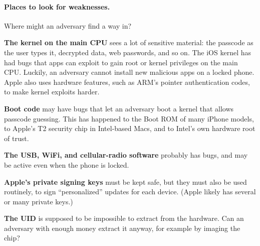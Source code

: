 \paragraph{Places to look for weaknesses.}
Where might an adversary find a way in?
\begin{compactitem}
  \item \textbf{The kernel on the main CPU} sees a lot of sensitive
        material: the passcode as the user types it, decrypted data, web
        passwords, and so on.
        The iOS kernel has had bugs that apps can exploit to gain root or
        kernel privileges on the main CPU.
        Luckily, an adversary cannot install new malicious apps on a locked
        phone.
        Apple also uses hardware features, such as ARM's pointer
        authentication codes, to make kernel exploits
        harder.\autocite{corbet:pac,azad:pac}
  \item \textbf{Boot code} may have bugs that let an adversary boot a
        kernel that allows passcode guessing.
        This has happened to the Boot ROM of many iPhone models, to Apple's
        T2 security chip in Intel-based Macs,\autocite{goodin:t2} and to
        Intel's own hardware root of trust.\autocite{ermolov:intel}
  \item \textbf{The USB, WiFi, and cellular-radio software} probably has
        bugs, and may be active even when the phone is locked.
  \item \textbf{Apple's private signing keys} must be kept safe, but
        they must also be used routinely, to sign ``personalized''
        updates for each device.
        (Apple likely has several or many private keys.)
  \item \textbf{The UID} is supposed to be impossible to extract from the
        hardware.
        Can an adversary with enough money extract it anyway, for example
        by imaging the chip?
\end{compactitem}

